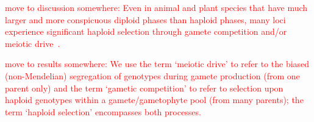 \documentclass[10pt,letterpaper]{article}
\begin{document}

\textcolor{red}{move to discussion somewhere:
Even in animal and plant species that have much larger and more conspicuous diploid phases than haploid phases, many loci experience significant haploid selection through gamete competition and/or meiotic drive~\cite{Mulcahy:1996ha,JOSEPH:2004haa}. }

\textcolor{red}{move to results somewhere:
We use the term `meiotic drive' to refer to the biased (non-Mendelian) segregation of genotypes during gamete production (from one parent only) and the term `gametic competition' to refer to selection upon haploid genotypes within a gamete/gametophyte pool (from many parents); the term `haploid selection' encompasses both processes. }
\end{document}
